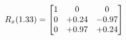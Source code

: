 \documentclass[preview]{standalone}
\begin{document}
\begin{align*}
\special{dvisvgm:raw <g id='unique000'>}R_{x}(1.33) = \begin{bmatrix}1 & 0 & 0 \\0 & +0.24 & -0.97 \\0 & +0.97 & +0.24\end{bmatrix}\special{dvisvgm:raw </g>}
\end{align*}
\end{document}
